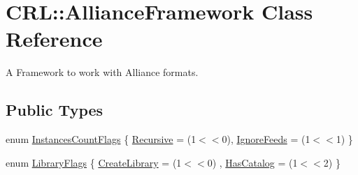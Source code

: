 \hypertarget{classCRL_1_1AllianceFramework}{}\section{C\+RL\+:\+:Alliance\+Framework Class Reference}
\label{classCRL_1_1AllianceFramework}


A Framework to work with Alliance formats.  


\subsection*{Public Types}
\begin{DoxyCompactItemize}
\item 
enum \mbox{\hyperlink{classCRL_1_1AllianceFramework_a03ef94e043d2d25eb7a6a5f1ae176432}{Instances\+Count\+Flags}} \{ \newline
\mbox{\hyperlink{classCRL_1_1AllianceFramework_a03ef94e043d2d25eb7a6a5f1ae176432a3c65ebdaecc4b34b54a01ff3a5c3195a}{Recursive}} = (1$<$$<$0), 
\newline
\mbox{\hyperlink{classCRL_1_1AllianceFramework_a03ef94e043d2d25eb7a6a5f1ae176432a4a10630340ffb5b0aa9983f8b7f4cbe0}{Ignore\+Feeds}} = (1$<$$<$1)
 \}
\item 
enum \mbox{\hyperlink{classCRL_1_1AllianceFramework_a0ec1cd09dec34dfecfec22927b92cc25}{Library\+Flags}} \{ \newline
\mbox{\hyperlink{classCRL_1_1AllianceFramework_a0ec1cd09dec34dfecfec22927b92cc25ade58398b3ec849dc3aedb6a0812fbc7a}{Create\+Library}} = (1$<$$<$0)
, \newline
\mbox{\hyperlink{classCRL_1_1AllianceFramework_a0ec1cd09dec34dfecfec22927b92cc25a8d9678631764327cbfe81f8184fa9e05}{Has\+Catalog}} = (1$<$$<$2)
 \}
\end{DoxyCompactItemize}
